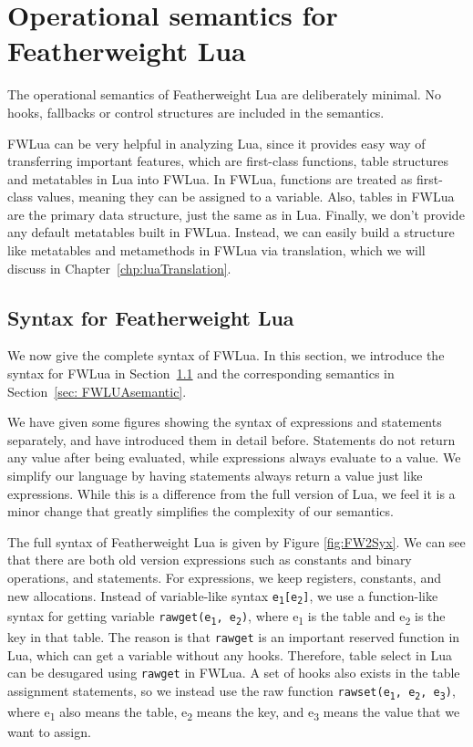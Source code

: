 \chapter{Operational semantics for Featherweight Lua} \label{chp: syntax and semantic}
The operational semantics of Featherweight Lua are deliberately minimal. No hooks, fallbacks or control structures are included in the semantics. 

FWLua can be very helpful in analyzing Lua, since it provides easy way of transferring important features, which are first-class functions, table structures and metatables in Lua into FWLua.
In FWLua, functions are treated as first-class values, meaning they can be assigned to a variable. Also, tables in FWLua are the primary data structure, just the same as in Lua. Finally, we don't provide any default metatables built in FWLua. Instead, we can easily build a structure like metatables and metamethods in FWLua via translation, which we will discuss in Chapter~\ref{chp:luaTranslation}.

\section{Syntax for Featherweight Lua}\label{sec: FWLUAsyntax}
We now give the complete syntax of FWLua. In this section, we introduce the syntax for FWLua in Section~\ref{sec: FWLUAsyntax} and the corresponding semantics in Section~\ref{sec: FWLUAsemantic}.

We have given some figures showing the syntax of expressions and statements separately, and have introduced them in detail before. Statements do not return any value after being evaluated, while expressions always evaluate to a value. We simplify our language by having statements always return a value just like expressions. While this is a difference from the full version of Lua, we feel it is a minor change that greatly simplifies the complexity of our semantics.

The full syntax of Featherweight Lua is given by Figure \ref{fig:FW2Syx}. We can see that there are both old version expressions such as constants and binary operations, and statements. For expressions, we keep registers, constants, and new allocations. Instead of variable-like syntax {\tt e\textsubscript{1}[e\textsubscript{2}]}, we use a function-like syntax for getting variable {\tt rawget(e\textsubscript{1}, e\textsubscript{2})}, where e\textsubscript{1} is the table and e\textsubscript{2} is the key in that table. The reason is that {\tt rawget} is an important reserved function in Lua, which can get a variable without any hooks. Therefore, table select in Lua can be desugared using {\tt rawget} in FWLua. A set of hooks also exists in the table assignment statements, so we instead use the raw function {\tt rawset(e\textsubscript{1}, e\textsubscript{2}, e\textsubscript{3})}, where e\textsubscript{1} also means the table, e\textsubscript{2} means the key, and e\textsubscript{3} means the value that we want to assign.


